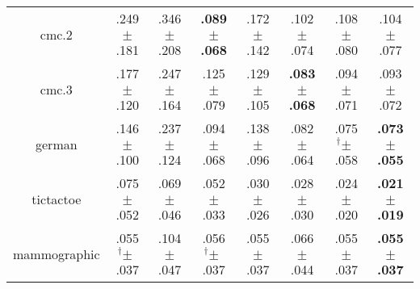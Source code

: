 \begin{tabular}{|c|ccccccc|}
cmc.2 & .249$^{\phantom{\dag}}\pm^{\phantom{\dag}}$.181\cellcolor{red!9} & .346$^{\phantom{\dag}}\pm^{\phantom{\dag}}$.208\cellcolor{red!40} & \textbf{.089$^{\phantom{\dag}}\pm^{\phantom{\dag}}$.068}\cellcolor{green!40} & .172$^{\phantom{\dag}}\pm^{\phantom{\dag}}$.142\cellcolor{green!14} & .102$^{\phantom{\dag}}\pm^{\phantom{\dag}}$.074\cellcolor{green!36} & .108$^{\phantom{\dag}}\pm^{\phantom{\dag}}$.080\cellcolor{green!34} & .104$^{\phantom{\dag}}\pm^{\phantom{\dag}}$.077\cellcolor{green!35} \\
cmc.3 & .177$^{\phantom{\dag}}\pm^{\phantom{\dag}}$.120\cellcolor{red!5} & .247$^{\phantom{\dag}}\pm^{\phantom{\dag}}$.164\cellcolor{red!40} & .125$^{\phantom{\dag}}\pm^{\phantom{\dag}}$.079\cellcolor{green!19} & .129$^{\phantom{\dag}}\pm^{\phantom{\dag}}$.105\cellcolor{green!17} & \textbf{.083$^{\phantom{\dag}}\pm^{\phantom{\dag}}$.068}\cellcolor{green!40} & .094$^{\phantom{\dag}}\pm^{\phantom{\dag}}$.071\cellcolor{green!34} & .093$^{\phantom{\dag}}\pm^{\phantom{\dag}}$.072\cellcolor{green!35} \\
german & .146$^{\phantom{\dag}}\pm^{\phantom{\dag}}$.100\cellcolor{green!4} & .237$^{\phantom{\dag}}\pm^{\phantom{\dag}}$.124\cellcolor{red!40} & .094$^{\phantom{\dag}}\pm^{\phantom{\dag}}$.068\cellcolor{green!29} & .138$^{\phantom{\dag}}\pm^{\phantom{\dag}}$.096\cellcolor{green!8} & .082$^{\phantom{\dag}}\pm^{\phantom{\dag}}$.064\cellcolor{green!35} & .075$^{\dag}\pm^{\phantom{\dag}}$.058\cellcolor{green!38} & \textbf{.073$^{\phantom{\dag}}\pm^{\phantom{\dag}}$.055}\cellcolor{green!40} \\
tictactoe & .075$^{\phantom{\dag}}\pm^{\phantom{\dag}}$.052\cellcolor{red!40} & .069$^{\phantom{\dag}}\pm^{\phantom{\dag}}$.046\cellcolor{red!31} & .052$^{\phantom{\dag}}\pm^{\phantom{\dag}}$.033\cellcolor{red!6} & .030$^{\phantom{\dag}}\pm^{\phantom{\dag}}$.026\cellcolor{green!26} & .028$^{\phantom{\dag}}\pm^{\phantom{\dag}}$.030\cellcolor{green!29} & .024$^{\phantom{\dag}}\pm^{\phantom{\dag}}$.020\cellcolor{green!36} & \textbf{.021$^{\phantom{\dag}}\pm^{\phantom{\dag}}$.019}\cellcolor{green!40} \\
mammographic & .055$^{\dag}\pm^{\phantom{\dag}}$.037\cellcolor{green!39} & .104$^{\phantom{\dag}}\pm^{\phantom{\dag}}$.047\cellcolor{red!40} & .056$^{\dag}\pm^{\phantom{\dag}}$.037\cellcolor{green!37} & .055$^{\phantom{\dag}}\pm^{\phantom{\dag}}$.037\cellcolor{green!39} & .066$^{\phantom{\dag}}\pm^{\phantom{\dag}}$.044\cellcolor{green!22} & .055$^{\phantom{\dag}}\pm^{\phantom{\dag}}$.037\cellcolor{green!39} & \textbf{.055$^{\phantom{\dag}}\pm^{\phantom{\dag}}$.037}\cellcolor{green!40} \\

\end{tabular}
